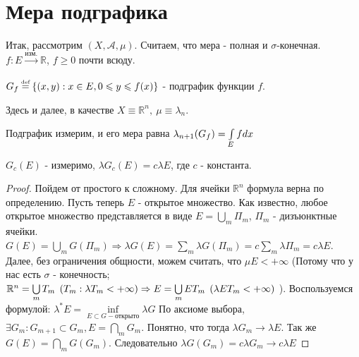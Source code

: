 \section{Мера подграфика}

Итак, рассмотрим $\left(X, \mathscr{A}, \mu \right)$. Считаем, что мера - полная и $\sigma$-конечная. 
$f: E \xrightarrow[]{\text{изм.}} \mathbb{R}$, $f \geqslant 0$ почти всюду.
\begin{definition}
	$G_f \defeq \left\{ (x,y) : x \in E, 0 \leqslant y \leqslant f(x) \right\}$ - подграфик функции $f$.
\end{definition}

Здесь и далее, в качестве $X \equiv \mathbb{R}^{n}, \: \mu \equiv \lambda_n$.

\begin{theorem}
	Подграфик измерим, и его мера равна $\lambda_{n + 1}(G_f) = \int\limits_{E} fdx$
\end{theorem}

\begin{statement}
	$G_c(E)$ - измеримо, $\lambda G_c(E) = c \lambda E$, где $c$ - константа.
\end{statement}

\begin{proof}
	Пойдем от простого к сложному. Для ячейки $\mathbb{R}^n$ формула верна по определению. 
	Пусть теперь $E$ - открытое множество. Как известно, любое открытое множество представляется в виде $E = \bigcup\limits_{m} \Pi_m$, $\Pi_m$ - дизъюнктные ячейки.
	$G(E) = \bigcup\limits_{m} G(\Pi_m) \Rightarrow \lambda G(E) = \sum\limits_{m} \lambda G(\Pi_m) = c \sum\limits_{m}\lambda \Pi_m = c\lambda E$.
	Далее, без ограничения общности, можем считать, что $\mu E < +\infty$ (Потому что у нас есть $\sigma$ - конечность; 
	$\\ \mathbb{R}^n = \bigcup\limits_{m}T_m \:\:(T_m : \lambda T_m < +\infty)\Rightarrow E = \bigcup\limits_{m} ET_m \:\: (\lambda ET_m < +\infty)$ ).
	Воспользуемся формулой: $\lambda^{\ast} E = \inf\limits_{E\subset G - \text{открыто}} \lambda G$
	По аксиоме выбора,  $\exists G_m : G_{m+1} \subset G_{m}, E = \bigcap\limits_{m} G_m$. Понятно, что тогда $\lambda G_m \rightarrow \lambda E$. 
	Так же $G(E) = \bigcap\limits_{m} G(G_m)$. Следовательно $\lambda G(G_m) =  c\lambda G_m \rightarrow c\lambda E$
\end{proof}

